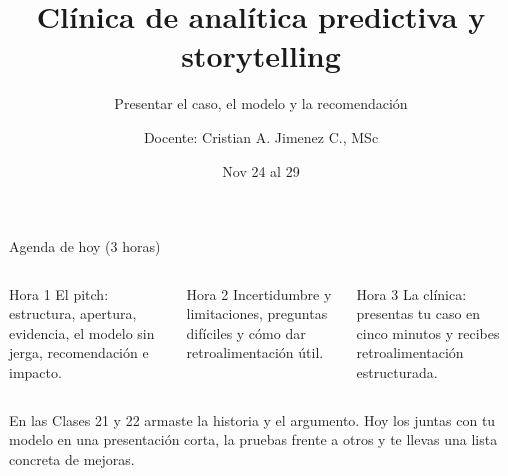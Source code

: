 \documentclass[aspectratio=169,11pt]{beamer}
\title{Clínica de analítica predictiva y storytelling}
\subtitle{Presentar el caso, el modelo y la recomendación}
\author{Docente: Cristian A. Jimenez C., MSc}
\date{Nov 24 al 29}
\begin{document}
{
\begin{frame}
  \titlepage
\end{frame}
}

\begin{frame}[t]{Agenda de hoy (3 horas)}
  \begin{columns}[T,onlytextwidth]
    \begin{block}{Hora 1}
      \small El pitch: estructura, apertura, evidencia, el modelo sin
      jerga, recomendación e impacto.
    \end{block}
    \begin{block}{Hora 2}
      \small Incertidumbre y limitaciones, preguntas difíciles y cómo dar
      retroalimentación útil.
    \end{block}
    \begin{block}{Hora 3}
      \small La clínica: presentas tu caso en cinco minutos y recibes
      retroalimentación estructurada.
    \end{block}
  \end{columns}
  \vspace{0.3cm}
  \small En las Clases 21 y 22 armaste la historia y el argumento. Hoy los
  juntas con tu modelo en una presentación corta, la pruebas frente a otros
  y te llevas una lista concreta de mejoras.
\end{frame}
\end{document}
